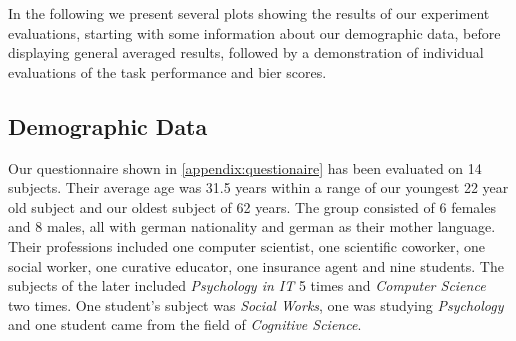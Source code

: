 \documentclass[../main/main.tex]{subfiles}
\begin{document}
In the following we present several plots showing the results of our experiment evaluations, starting with some information about our demographic data, before displaying general averaged results, followed by a demonstration of individual evaluations of the task performance and bier scores.
\subsection{Demographic Data}
Our questionnaire shown in \ref{appendix:questionaire} has been evaluated on 14 subjects. Their average age was 31.5 years within a range of our youngest 22 year old subject and our oldest subject of 62 years. The group consisted of 6 females and 8 males, all with german nationality and german as their mother language. Their professions included one computer scientist, one scientific coworker, one social worker, one curative educator, one insurance agent and nine students. The subjects of the later included \textit{Psychology in IT} 5 times and \textit{Computer Science} two times. One student's subject was \textit{Social Works}, one was studying \textit{Psychology} and one student came from the field of \textit{Cognitive Science}.
\end{document}
